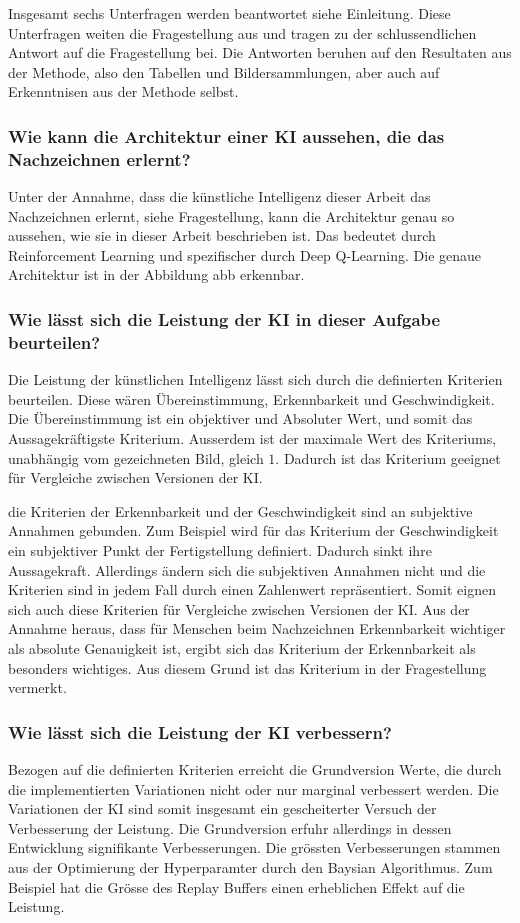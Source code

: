 Insgesamt sechs Unterfragen werden beantwortet {siehe Einleitung}. Diese
Unterfragen weiten die Fragestellung aus und tragen zu der schlussendlichen
Antwort auf die Fragestellung bei. Die Antworten beruhen auf den Resultaten aus
der Methode, also den Tabellen und Bildersammlungen, aber auch auf Erkenntnisen
aus der Methode selbst.

\subsubsection*{Wie kann die Architektur einer KI aussehen, die das Nachzeichnen erlernt?}
Unter der Annahme, dass die künstliche Intelligenz dieser Arbeit das
Nachzeichnen erlernt, {siehe Fragestellung}, kann die Architektur genau so
aussehen, wie sie in dieser Arbeit beschrieben ist. Das bedeutet durch
Reinforcement Learning und spezifischer durch Deep Q-Learning. Die genaue
Architektur ist in der Abbildung {abb} erkennbar.

\subsubsection*{Wie lässt sich die Leistung der KI in dieser Aufgabe beurteilen?}
Die Leistung der künstlichen Intelligenz lässt sich durch die definierten
Kriterien beurteilen. Diese wären Übereinstimmung, Erkennbarkeit und
Geschwindigkeit. Die Übereinstimmung ist ein objektiver und Absoluter Wert, und
somit das Aussagekräftigste Kriterium. Ausserdem ist der maximale Wert des
Kriteriums, unabhängig vom gezeichneten Bild, gleich $1$. Dadurch ist das
Kriterium geeignet für Vergleiche zwischen Versionen der KI.

die Kriterien der Erkennbarkeit und der Geschwindigkeit sind an subjektive
Annahmen gebunden. Zum Beispiel wird für das Kriterium der Geschwindigkeit ein
subjektiver Punkt der Fertigstellung definiert. Dadurch sinkt ihre Aussagekraft.
Allerdings ändern sich die subjektiven Annahmen nicht und die Kriterien sind in
jedem Fall durch einen Zahlenwert repräsentiert. Somit eignen sich auch diese
Kriterien für Vergleiche zwischen Versionen der KI. Aus der Annahme heraus, dass
für Menschen beim Nachzeichnen Erkennbarkeit wichtiger als absolute Genauigkeit
ist, ergibt sich das Kriterium der Erkennbarkeit als besonders wichtiges. Aus
diesem Grund ist das Kriterium in der Fragestellung vermerkt.



\subsubsection*{Wie lässt sich die Leistung der KI verbessern?}
Bezogen auf die definierten Kriterien erreicht die Grundversion Werte, die durch
die implementierten Variationen nicht oder nur marginal verbessert werden. Die
Variationen der KI sind somit insgesamt ein gescheiterter Versuch der
Verbesserung der Leistung. Die Grundversion erfuhr allerdings in dessen
Entwicklung signifikante Verbesserungen. Die grössten Verbesserungen stammen aus
der Optimierung der Hyperparamter durch den Baysian Algorithmus. Zum Beispiel
hat die Grösse des Replay Buffers einen erheblichen Effekt auf die Leistung.

